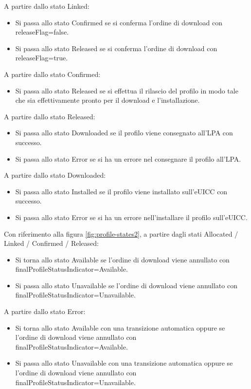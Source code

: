 \documentclass[10pt, oneside]{book}
\begin{document}
A partire dallo stato Linked:
\begin{itemize}
\item Si passa allo stato Confirmed se si conferma l'ordine di download con releaseFlag=false.
\item Si passa allo stato Released se si conferma l'ordine di download con releaseFlag=true.
\end{itemize}
A partire dallo stato Confirmed:
\begin{itemize}
\item Si passa allo stato Released se si effettua il rilascio del profilo in modo tale che sia effettivamente pronto per il download e l'installazione.
\end{itemize}
A partire dallo stato Released:
\begin{itemize}
\item Si passa allo stato Downloaded se il profilo viene consegnato all'LPA con successo.
\item Si passa allo stato Error se si ha un errore nel consegnare il profilo all'LPA.
\end{itemize}
A partire dallo stato Downloaded:
\begin{itemize}
\item Si passa allo stato Installed se il profilo viene installato sull'eUICC con successo.
\item Si passa allo stato Error se si ha un errore nell'installare il profilo sull'eUICC.
\end{itemize}
Con riferimento alla figura \ref{fig:profile-states2}, a partire dagli stati Allocated / Linked / Confirmed / Released:
\begin{itemize}
\item Si torna allo stato Available se l'ordine di download viene annullato con finalProfileStatusIndicator=Available.
\item Si passa allo stato Unavailable se l'ordine di download viene annullato con finalProfileStatusIndicator=Unavailable.
\end{itemize}
A partire dallo stato Error:
\begin{itemize}
\item Si torna allo stato Available con una transizione automatica oppure se l'ordine di download viene annullato con finalProfileStatusIndicator=Available.
\item Si passa allo stato Unavailable con una transizione automatica oppure se l'ordine di download viene annullato con finalProfileStatusIndicator=Unavailable.
\end{itemize}
\end{document}
